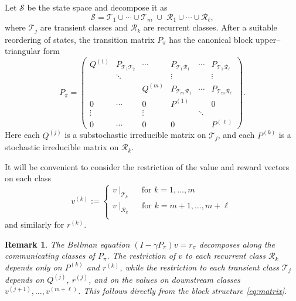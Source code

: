 \documentclass[letterpaper, 10 pt, conference]{ieeeconf}
\newtheorem{remark}{Remark}
\newcommand{\R}{\mathcal{R}}
\newcommand{\T}{\mathcal{T}}
\begin{document}

Let $\mathcal S$ be the state space and decompose it as
\[
\mathcal S = \T_1 \cup \cdots \cup \T_m \;\cup\; \R_1 \cup \cdots \cup \R_\ell ,
\]
where $\T_j$ are transient classes and $\R_k$ are recurrent classes.
After a suitable reordering of states, the transition matrix $P_\pi$ has the
canonical block upper–triangular form
\begin{equation}
\label{eq:matrix}
P_\pi =
\begin{pmatrix}
Q^{(1)} &   P_{\T_1\T_2}    &   \cdots     & P_{\T_1 \R_1} & \cdots & P_{\T_1 \R_\ell} \\
        & \ddots &        & \vdots      &        & \vdots        \\
        &        & Q^{(m)}& P_{\T_m \R_1} & \cdots & P_{\T_m \R_\ell} \\
\hline
0       & \cdots & 0      & P^{(1)}     &        & 0             \\
\vdots  &        & \vdots &             & \ddots &               \\
0       & \cdots & 0      & 0           &        & P^{(\ell)}
\end{pmatrix}.
\end{equation}
Here each $Q^{(j)}$ is a substochastic irreducible matrix on $\T_j$, and each
$P^{(k)}$ is a stochastic irreducible matrix on $\R_k$.

It will be convenient to consider the restriction of the value and reward vectors on each class
$$
v^{(k)} := 
\begin{cases}
    v\mid_{\T_k} \quad \text{ for } k=1,\dots,m \\ 
    v\mid_{\R_k} \quad \text{ for } k=m+1,\dots,m+\ell \\ 
\end{cases}
$$
and similarly for $r^{(k)}$.

\begin{remark}
\label{rem:decomposition}
The Bellman equation $(I-\gamma P_\pi)v = r_\pi$ decomposes along the communicating
classes of $P_\pi$.
The restriction of $v$ to each recurrent class $\R_k$ depends only on
$P^{(k)}$ and $r^{(k)}$, while the restriction to each transient class $\T_j$
depends on $Q^{(j)}$, $r^{(j)}$, and on the values on downstream classes $v^{(j+1)}, \dots, v^{(m+\ell)}$.
This follows directly from the block structure \eqref{eq:matrix}.
\end{remark}
\end{document}
